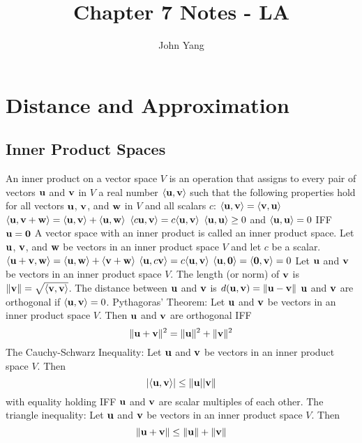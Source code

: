 \documentclass{article}
\title{Chapter 7 Notes - LA} %
\author{John Yang}
\begin{document}
    \maketitle
    \tableofcontents
    \section{Distance and Approximation} %
    \subsection{Inner Product Spaces} 
    \begin{outline}
        \1 An inner product on a vector space $V$ is an operation that assigns to every pair of vectors \(\vb u\) and \(\vb v\) in $V$ a real number \(\langle\vb u,\vb v\rangle\) such that the following properties hold for all vectors \(\vb u\), \(\vb v\), and \(\vb w\) in $V$ and all scalars $c$:
            \2 \(\langle\vb u,\vb v\rangle=\langle\vb v,\vb u\rangle\)
            \2 \(\langle\vb u,\vb v+\vb w\rangle=\langle\vb u,\vb v\rangle+\langle\vb u,\vb w\rangle\)
            \2 \(\langle c\vb u,\vb v\rangle=c\langle\vb u,\vb v\rangle\)
            \2 \(\langle\vb u,\vb u\rangle\geq 0\) and \(\langle\vb u,\vb u\rangle=0\) IFF \(\vb u=\vb 0\)
        \1 A vector space with an inner product is called an inner product space. 
        \1 Let \(\vb u\), \(\vb v\), and \(\vb w\) be vectors in an inner product space $V$ and let \(c\) be a scalar. 
            \2 \(\langle\vb u+\vb v,\vb w\rangle=\langle\vb u,\vb w\rangle+\langle\vb v+\vb w\rangle\)
            \2 \(\langle\vb u,c\vb v\rangle=c\langle\vb u,\vb v\rangle\)
            \2 \(\langle\vb u,\vb 0\rangle=\langle\vb 0,\vb v\rangle=0\)
        \1 Let \(\vb u\) and \(\vb v\) be vectors in an inner product space $V$. 
            \2 The length (or norm) of \(\vb v\) is \(\|\vb v\|=\sqrt{\langle\vb v,\vb v\rangle}\). 
            \2 The distance between \(\vb u\) and \(\vb v\) is \(d(\vb u,\vb v)=\|\vb u-\vb v\|\)
            \2 \(\vb u\) and \(\vb v\) are orthogonal if \(\langle\vb u,\vb v\rangle=0\). 
        \1 Pythagoras' Theorem: Let \(\vb u\) and \(\vb v\) be vectors in an inner product space $V$. Then \(\vb u\) and \(\vb v\) are orthogonal IFF \[\|\vb u+\vb v\|^2=\|\vb u\|^2+\|\vb v\|^2\]
        \1 The Cauchy-Schwarz Inequality: Let \(\vb u\) and \(\vb v\) be vectors in an inner product space $V$. Then \[|\langle\vb u,\vb v\rangle|\leq\|\vb u\\||\vb v\|\] with equality holding IFF $\vb u$ and $\vb v$ are scalar multiples of each other. 
	\1 The triangle inequality: Let $\vb u$ and $\vb v$ be vectors in an inner product space $V$. Then \[\|\vb u+\vb v\|\leq\|\vb u\|+\|\vb v\|\]
    \end{outline}
\end{document}
